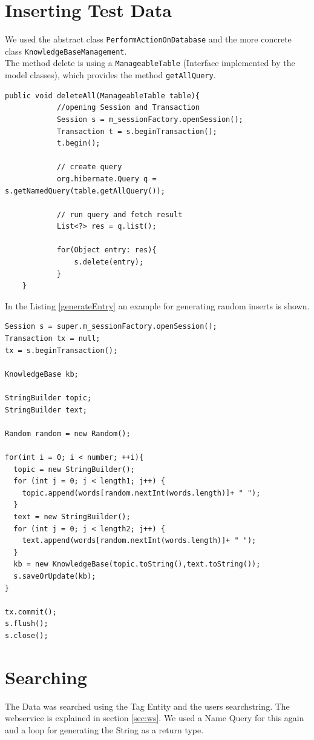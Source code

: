 \documentclass[12pt]{article}
\begin{document}
\section{Inserting Test Data}
We used the abstract class \texttt{PerformActionOnDatabase} and the more concrete class \texttt{KnowledgeBaseManagement}. \\
The method delete is using a \texttt{ManageableTable} (Interface implemented by the model classes), which provides the method \texttt{getAllQuery}.
\begin{lstlisting}[caption=Deleting all old entries, label=delete]
 public void deleteAll(ManageableTable table){
            //opening Session and Transaction
            Session s = m_sessionFactory.openSession();
            Transaction t = s.beginTransaction();
            t.begin();

            // create query
            org.hibernate.Query q = s.getNamedQuery(table.getAllQuery());

            // run query and fetch result
            List<?> res = q.list();

            for(Object entry: res){
                s.delete(entry);
            }
    }
\end{lstlisting}
In the Listing \ref{generateEntry} an example for generating random inserts is shown.
\begin{lstlisting}[caption=Generating Inserts (as an example), label=generateEntry]
Session s = super.m_sessionFactory.openSession();
Transaction tx = null;
tx = s.beginTransaction();

KnowledgeBase kb;

StringBuilder topic;
StringBuilder text;

Random random = new Random();

for(int i = 0; i < number; ++i){
  topic = new StringBuilder();
  for (int j = 0; j < length1; j++) {
    topic.append(words[random.nextInt(words.length)]+ " ");
  }
  text = new StringBuilder();
  for (int j = 0; j < length2; j++) {
    text.append(words[random.nextInt(words.length)]+ " ");
  }
  kb = new KnowledgeBase(topic.toString(),text.toString());
  s.saveOrUpdate(kb);
}

tx.commit();
s.flush();
s.close();
\end{lstlisting}
\section{Searching}
The Data was searched using the Tag Entity and the users searchstring. The webservice is explained in section \ref{sec:ws}. We used a Name Query for this again and a loop for generating the String as a return type.
\end{document}
